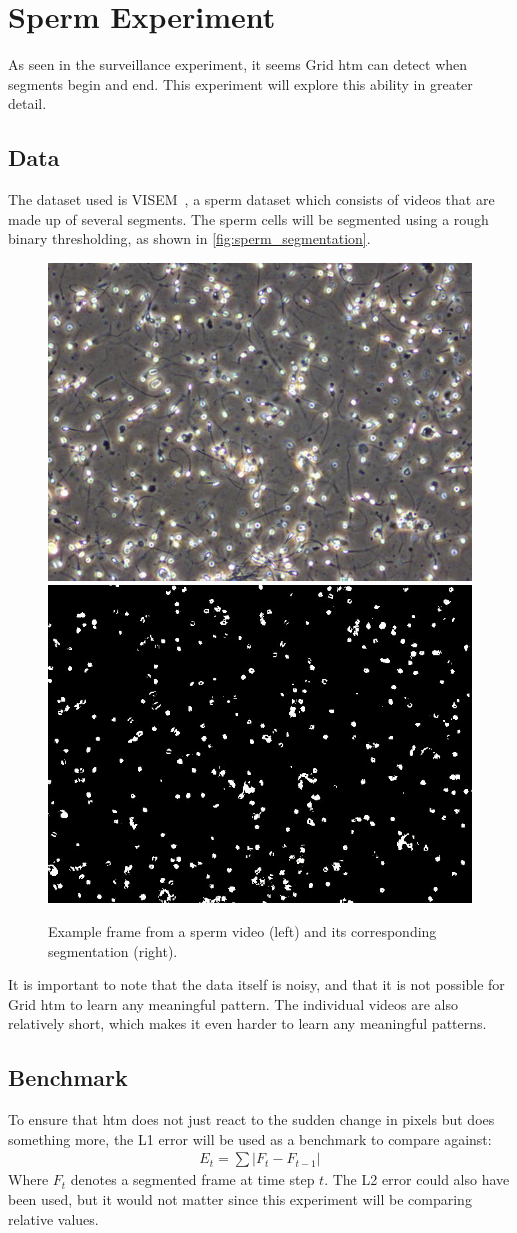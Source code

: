 \section{Sperm Experiment}
As seen in the surveillance experiment, it seems Grid \gls*{htm} can detect when segments begin and end. This experiment will explore this ability in greater detail.
\subsection{Data}
The dataset used is VISEM~\cite{VISEM}, a sperm dataset which consists of videos that are made up of several segments. The sperm cells will be segmented using a rough binary thresholding, as shown in \autoref{fig:sperm_segmentation}.
\begin{figure}[H]
    \centering
    \includegraphics[width=.45\textwidth]{resources/experiments/sperm/sperm_example.png}
    \includegraphics[width=.45\textwidth]{resources/experiments/sperm/sperm_seg_example.png}
    \caption[Sperm Example Frame]{Example frame from a sperm video (left) and its corresponding segmentation (right).}
    \label{fig:sperm_segmentation}
\end{figure}
It is important to note that the data itself is noisy, and that it is not possible for Grid \gls*{htm} to learn any meaningful pattern. The individual videos are also relatively short, which makes it even harder to learn any meaningful patterns.
\subsection{Benchmark}
To ensure that \gls*{htm} does not just react to the sudden change in pixels but does something more, the L1 error will be used as a benchmark to compare against:
\begin{align*}
    E_t=\sum|F_t-F_{t-1}|
\end{align*}
Where $F_t$ denotes a segmented frame at time step $t$. The L2 error could also have been used, but it would not matter since this experiment will be comparing relative values.
